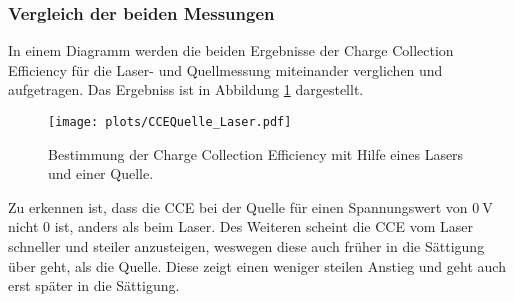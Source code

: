 \subsubsection{Vergleich der beiden Messungen}
\label{sec:Vergleich}

In einem Diagramm werden die beiden Ergebnisse der Charge Collection 
Efficiency für die Laser- und Quellmessung miteinander verglichen 
und aufgetragen. Das Ergebniss ist in Abbildung 
\ref{fig:Vergleich} dargestellt.

\begin{figure}[H]
  \centering
  \texttt{[image: plots/CCEQuelle\_Laser.pdf]}
  \caption{Bestimmung der Charge Collection Efficiency mit Hilfe eines 
  Lasers und einer Quelle. }
  \label{fig:Vergleich}
\end{figure}

Zu erkennen ist, dass die CCE bei der Quelle für einen Spannungswert 
von $\SI{0}{\volt}$ nicht 0 ist, anders als beim Laser. Des Weiteren 
scheint die CCE vom Laser schneller und steiler anzusteigen, weswegen 
diese auch früher in die Sättigung über geht, als die Quelle. Diese zeigt 
einen weniger steilen Anstieg und geht auch erst später in die Sättigung.